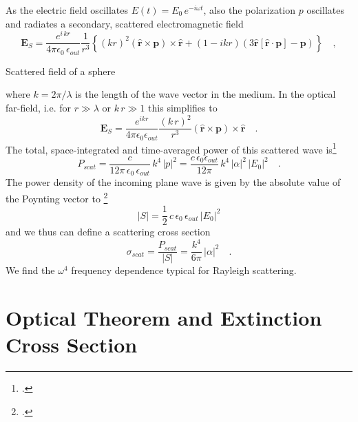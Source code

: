 As the electric field oscillates $E(t) = E_0 \, e^{-i \omega t}$, also the polarization $p$ oscillates and radiates a secondary, scattered electromagnetic field 
\begin{equation}
  \mathbf{E}_S = \frac{ e^{i \, k  r} }{4\pi\epsilon_0 \, \epsilon_{out}}  \frac{1}{r^3}\left\{
      (k r )^2 \left( \hat{\mathbf{r}} \times \mathbf{p} \right) \times \hat{\mathbf{r}} +
      \left( 1 -  i k r \right)
        \left( 3\hat{\mathbf{r}} \left[\hat{\mathbf{r}} \cdot \mathbf{p}\right] - \mathbf{p} \right)
    \right\} \quad ,
\end{equation}
%
\begin{marginfigure}
  \caption{Scattered field of  a sphere}
\end{marginfigure}
%
where $k = 2 \pi / \lambda$ is the length of the wave vector in the medium. In the optical far-field, i.e. for $r \gg \lambda$ or $k \, r \gg 1$ this simplifies to 
\begin{equation}
  \mathbf{E}_S = \frac{e^{ikr}}{4\pi\epsilon_0 \epsilon_{out} } 
      \frac{( k \, r)^2}{ r^3} \left( \hat{\mathbf{r}} \times \mathbf{p} \right) \times \hat{\mathbf{r}}  \quad .
\end{equation}
The total, space-integrated and time-averaged power of this scattered wave is\footcite[chapter 4.5.2]{Nolting-ED}
\begin{equation}
P_{scat} =\frac{c  }{12 \pi  \, \epsilon_0 \, \epsilon_{out} } \, k^4 \, |p|^2 =
\frac{c \, \epsilon_0 \epsilon_{out} }{12 \pi  } \, k^4 \, |\alpha|^2 \, |E_0|^2 \quad .
\end{equation}
The power density of the incoming plane wave is given by the absolute value of the Poynting vector to \footcite[chapter 4.3.8]{Nolting-ED}
\begin{equation}
 |S| = \frac{1}{2} \, c \, \epsilon_0 \, \epsilon_{out} \, |E_0|^2
\end{equation}
and we thus can define a scattering cross section
\begin{equation}
\sigma_{scat} = \frac{P_{scat}}{|S|} = \frac{k^4}{6 \pi }  \, |\alpha|^2  \quad .
\end{equation}
We find the $\omega^4$ frequency dependence typical for Rayleigh scattering.



\section{Optical Theorem and Extinction Cross Section}

